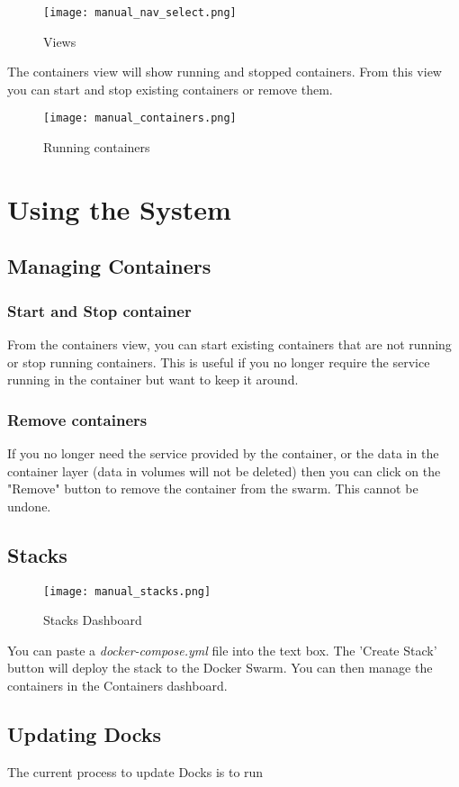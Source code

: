 \documentclass[]{article}
\begin{document}
\begin{figure}[H]
	\centering
	\texttt{[image: manual\_nav\_select.png]}
	\caption{Views}
\end{figure}

The containers view will show running and stopped containers.
From this view you can start and stop existing containers or remove them.
\begin{figure}[H]
	\centering
	\texttt{[image: manual\_containers.png]}
	\caption{Running containers}
\end{figure}

\section{Using the System}
\subsection{Managing Containers}
\subsubsection{Start and Stop container}
From the containers view, you can start existing containers that are not running
or stop running containers. This is useful if you no longer require the service running in the container but want to keep it around.

\subsubsection{Remove containers}
If you no longer need the service provided by the container, or the data in the container layer (data in volumes will not be deleted) then you can click on the "Remove" button to remove the container from the swarm. This cannot be undone.

\subsection{Stacks}
\begin{figure}[H]
	\centering
	\texttt{[image: manual\_stacks.png]}
	\caption{Stacks Dashboard}
\end{figure}

You can paste a \emph{docker-compose.yml} file into the text box. The 'Create Stack' button will deploy the stack to the Docker Swarm. You can then manage the containers in the Containers dashboard.

\subsection{Updating Docks}
The current process to update Docks is to run 
\end{document}
